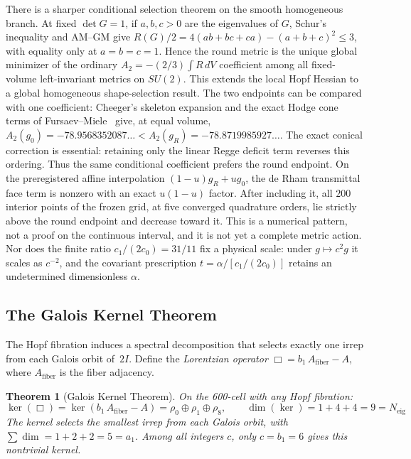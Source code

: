 \documentclass[12pt,a4paper]{article}
\newtheorem{theorem}{Theorem}
\theoremstyle{definition}
\begin{document}
There is a sharper conditional selection theorem on the smooth homogeneous
branch.  At fixed $\det G=1$, if $a,b,c>0$ are the eigenvalues of $G$, Schur's
inequality and AM--GM give $R(G)/2=4(ab+bc+ca)-(a+b+c)^2\leq3$, with equality
only at $a=b=c=1$.  Hence the round metric is the unique global minimizer of
the ordinary $A_2=-(2/3)\int R\,dV$ coefficient among all fixed-volume
left-invariant metrics on $SU(2)$.  This extends the local Hopf Hessian to a
global homogeneous shape-selection result.  The two endpoints can be compared
with one coefficient: Cheeger's skeleton expansion and the exact Hodge cone
terms of Fursaev--Miele~\cite{cheeger1983,fursaevmiele1997} give, at equal volume,
$A_2(g_0)=-78.9568352087\ldots<A_2(g_R)=-78.8719985927\ldots$.
The exact conical correction is essential: retaining only the linear Regge
deficit term reverses this ordering.  Thus the same conditional coefficient
prefers the round endpoint.  On the preregistered affine interpolation
$(1-u)g_R+ug_0$, the de Rham transmittal face term is nonzero with an exact
$u(1-u)$ factor.  After including it, all $200$ interior points of the frozen
grid, at five converged quadrature orders, lie strictly above the round
endpoint and decrease toward it.  This is a numerical pattern, not a proof on
the continuous interval, and it is not yet a complete metric action.
Nor does the finite ratio $c_1/(2c_0)=31/11$ fix a physical scale: under
$g\mapsto c^2g$ it scales
as $c^{-2}$, and the covariant prescription $t=\alpha/[c_1/(2c_0)]$ retains an
undetermined dimensionless $\alpha$.

\subsection{The Galois Kernel Theorem}
\label{sec:galois_kernel}

The Hopf fibration induces a spectral decomposition that selects exactly one irrep from each Galois orbit of~$2I$.  Define the \emph{Lorentzian operator} $\Box = b_1 \, A_{\text{fiber}} - A$, where $A_{\text{fiber}}$ is the fiber adjacency.

\begin{theorem}[Galois Kernel Theorem]\label{thm:galois_kernel}
On the 600-cell with any Hopf fibration:
\begin{equation}
\ker(\Box) = \ker(b_1\,A_{\mathrm{fiber}} - A) = \rho_0 \oplus \rho_1 \oplus \rho_8, \qquad
\dim(\ker) = 1 + 4 + 4 = 9 = N_{\mathrm{eig}}
\label{eq:galois_kernel}
\end{equation}
The kernel selects the smallest irrep from each Galois orbit, with $\sum \dim = 1+2+2 = 5 = a_1$.  Among all integers $c$, only $c = b_1 = 6$ gives this nontrivial kernel.
\end{theorem}
\end{document}
